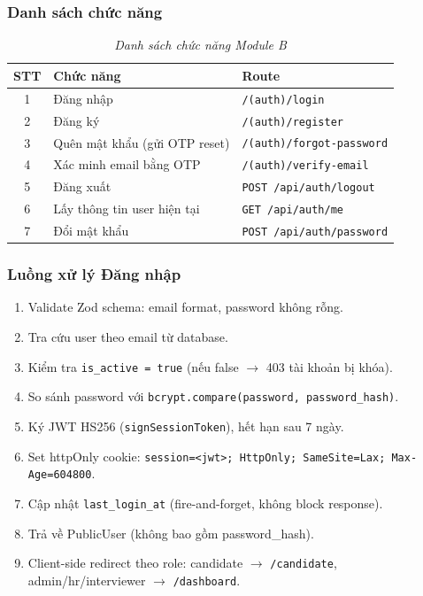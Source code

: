 \subsubsection*{Danh sách chức năng}
\begin{table}[H]
    \centering
    \renewcommand{\arraystretch}{1.3}
    \begin{tabular}{|c|l|l|}
        \hline
        \textbf{STT} & \textbf{Chức năng} & \textbf{Route} \\ \hline
        1 & Đăng nhập & \texttt{/(auth)/login} \\ \hline
        2 & Đăng ký & \texttt{/(auth)/register} \\ \hline
        3 & Quên mật khẩu (gửi OTP reset) & \texttt{/(auth)/forgot-password} \\ \hline
        4 & Xác minh email bằng OTP & \texttt{/(auth)/verify-email} \\ \hline
        5 & Đăng xuất & \texttt{POST /api/auth/logout} \\ \hline
        6 & Lấy thông tin user hiện tại & \texttt{GET /api/auth/me} \\ \hline
        7 & Đổi mật khẩu & \texttt{POST /api/auth/password} \\ \hline
    \end{tabular}
    \caption{\textit{Danh sách chức năng Module B}}
\end{table}

\subsubsection*{Luồng xử lý Đăng nhập}
\begin{enumerate}
    \item Validate Zod schema: email format, password không rỗng.
    \item Tra cứu user theo email từ database.
    \item Kiểm tra \texttt{is\_active = true} (nếu false $\to$ 403 tài khoản bị khóa).
    \item So sánh password với \texttt{bcrypt.compare(password, password\_hash)}.
    \item Ký JWT HS256 (\texttt{signSessionToken}), hết hạn sau 7 ngày.
    \item Set httpOnly cookie: \texttt{session=<jwt>; HttpOnly; SameSite=Lax; Max-Age=604800}.
    \item Cập nhật \texttt{last\_login\_at} (fire-and-forget, không block response).
    \item Trả về PublicUser (không bao gồm password\_hash).
    \item Client-side redirect theo role: candidate $\to$ \texttt{/candidate}, admin/hr/interviewer $\to$ \texttt{/dashboard}.
\end{enumerate}

